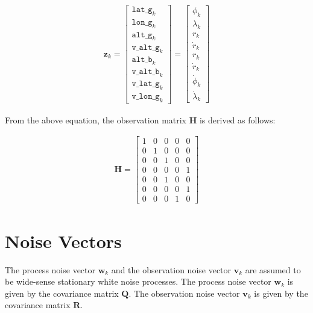 \begin{align}
    \mathbf{z}_k =
    \begin{bmatrix}
        \mathtt{lat\_g}_k \\
        \mathtt{lon\_g}_k \\
        \mathtt{alt\_g}_k \\
        \mathtt{v\_alt\_g}_k \\
        \mathtt{alt\_b}_k \\
        \mathtt{v\_alt\_b}_k \\
        \mathtt{v\_lat\_g}_k \\
        \mathtt{v\_lon\_g}_k
    \end{bmatrix}
    =
    \begin{bmatrix}
        \phi_k \\
        \lambda_k \\
        r_k \\
        \dot{r}_k \\
        r_k \\
        \dot{r}_k \\
        \dot{\phi}_k \\
        \dot{\lambda}_k
    \end{bmatrix}
\end{align}

From the above equation, the observation matrix $\mathbf{H}$ is derived as follows:

\begin{align}
    \mathbf{H} =
    \begin{bmatrix}
        1 & 0 & 0 & 0 & 0 \\
        0 & 1 & 0 & 0 & 0 \\
        0 & 0 & 1 & 0 & 0 \\
        0 & 0 & 0 & 0 & 1 \\
        0 & 0 & 1 & 0 & 0 \\
        0 & 0 & 0 & 0 & 1 \\
        0 & 0 & 0 & 1 & 0
    \end{bmatrix}
\end{align}


\section{Noise Vectors}
The process noise vector $\mathbf{w}_k$ and the observation noise vector $\mathbf{v}_k$ are assumed to be wide-sense stationary white noise processes.
The process noise vector $\mathbf{w}_k$ is given by the covariance matrix $\mathbf{Q}$.
The observation noise vector $\mathbf{v}_k$ is given by the covariance matrix $\mathbf{R}$.

